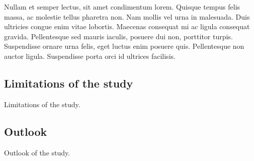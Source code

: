 \begin{multicols}{2}
Nullam et semper lectus, sit amet condimentum lorem. Quisque tempus felis massa, ac molestie tellus pharetra non. Nam mollis vel urna in malesuada. Duis ultricies congue enim vitae lobortis. Maecenas consequat mi ac ligula consequat gravida. Pellentesque sed mauris iaculis, posuere dui non, porttitor turpis. Suspendisse ornare urna felis, eget luctus enim posuere quis. Pellentesque non auctor ligula. Suspendisse porta orci id ultrices facilisis.



\subsection*{Limitations of the study}

Limitations of the study.

\subsection*{Outlook}

Outlook of the study. 

\end{multicols}

